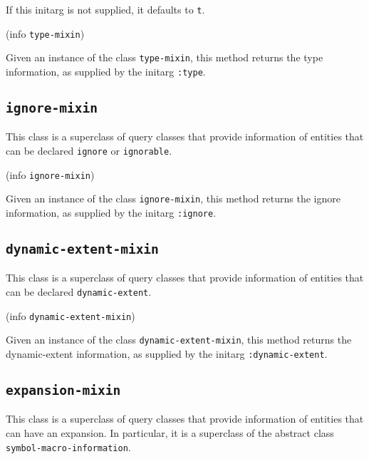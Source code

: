 
If this initarg is not supplied, it defaults to \texttt{t}.

 {(info {\tt type-mixin})}

Given an instance of the class \texttt{type-mixin}, this method
returns the type information, as supplied by the initarg
\texttt{:type}.

\subsection{\texttt{ignore-mixin}}
\label{sec-ignore-mixin}


This class is a superclass of query classes that provide information
of entities that can be declared \texttt{ignore} or \texttt{ignorable}.


 {(info {\tt ignore-mixin})}

Given an instance of the class \texttt{ignore-mixin}, this method
returns the ignore information, as supplied by the initarg
\texttt{:ignore}.

\subsection{\texttt{dynamic-extent-mixin}}
\label{sec-dynamic-extent-mixin}


This class is a superclass of query classes that provide information
of entities that can be declared \texttt{dynamic-extent}.


 {(info {\tt dynamic-extent-mixin})}

Given an instance of the class \texttt{dynamic-extent-mixin}, this method
returns the dynamic-extent information, as supplied by the initarg
\texttt{:dynamic-extent}.

\subsection{\texttt{expansion-mixin}}
\label{sec-expansion-mixin}

This class is a superclass of query classes that provide information
of entities that can have an expansion.  In particular, it is a
superclass of the abstract class \texttt{symbol-macro-information}.

